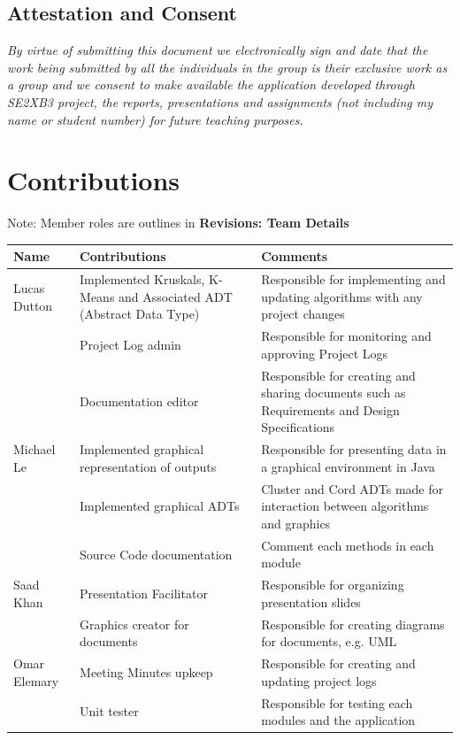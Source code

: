 \documentclass[12pt]{article}
\begin{document}
\subsection{Attestation and Consent}

\textit{By virtue of submitting this document we electronically sign
and date that the work being submitted by all the individuals in the 
group is their exclusive work as a group and we consent to make
available the application developed through SE2XB3 project, the 
reports, presentations and assignments (not including my name or 
student number) for future teaching purposes.}

\newpage

\section{Contributions}
Note: Member roles are outlines in \textbf{Revisions: Team Details}

\begin{table}[h]
\begin{tabularx}{\textwidth}{|l|X|X|}
\hline
\textbf{Name} & \textbf{Contributions} & \textbf{Comments} \\
\hline
Lucas Dutton & Implemented Kruskals, K-Means and Associated ADT
               (Abstract Data Type)
             & Responsible for implementing and updating algorithms
               with any project changes\\
\cline{2-3}
~ & Project Log admin 
  & Responsible for monitoring and approving Project Logs\\
\cline{2-3}
~ & Documentation editor
  & Responsible for creating and sharing documents such as 
    Requirements and Design Specifications\\
\hline
Michael Le & Implemented graphical representation of outputs
           & Responsible for presenting data in a graphical
             environment in Java\\
\cline{2-3}
~ & Implemented graphical ADTs 
  & Cluster and Cord ADTs made for interaction between algorithms
    and graphics\\
\cline{2-3}
~ & Source Code documentation & Comment each methods in each module\\
\hline
Saad Khan & Presentation Facilitator 
          & Responsible for organizing presentation slides\\
\cline{2-3}
~ & Graphics creator for documents 
  & Responsible for creating diagrams for documents, e.g. UML\\
\hline
Omar Elemary & Meeting Minutes upkeep
             & Responsible for creating and updating project logs\\
\cline{2-3}
~ & Unit tester
  & Responsible for testing each modules and the application\\
\hline
\end{tabularx}
\end{table}
\end{document}
